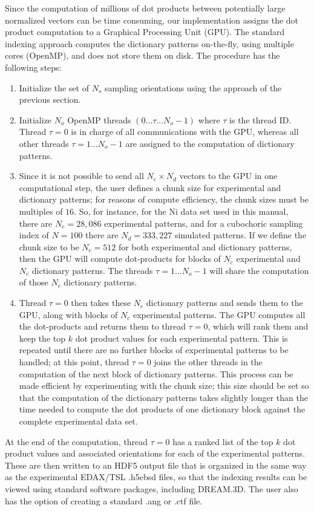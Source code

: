 \documentclass[DIV=calc, paper=letter, fontsize=11pt]{scrartcl}	 %
\begin{document}
Since the computation of millions of dot products between potentially large normalized vectors can be time consuming, our implementation 
assigns the dot product computation to a Graphical Processing Unit (GPU).  The standard indexing approach computes the dictionary patterns 
on-the-fly, using multiple cores (OpenMP), and does not store them on disk.  The procedure has the following steps:
\begin{enumerate}
\item Initialize the set of $N_s$ sampling orientations using the approach of the previous section.
\item Initialize $N_o$ OpenMP threads $(0\ldots \tau\ldots N_o-1)$ where $\tau$ is the thread ID.  Thread $\tau=0$ is in charge of all communications
with the GPU, whereas all other threads $\tau=1\ldots N_o-1$ are assigned to the computation of dictionary patterns.
\item Since it is not possible to send all $N_e\times N_d$ vectors to the GPU in one computational step, the user defines a chunk size for experimental and 
dictionary patterns; for reasons of compute efficiency, the chunk sizes must be multiples of $16$.  So, for instance, for the Ni data set used in this manual, there
are $N_e=28,086$ experimental patterns, and for a cubochoric sampling index of $N=100$ there are $N_d=333,227$ simulated patterns.  If we define the 
chunk size to be $N_c=512$ for both experimental and dictionary patterns, then the GPU will compute dot-products for blocks of $N_c$ experimental and 
$N_c$ dictionary patterns.  The threads $\tau=1\ldots N_o-1$ will share the computation of those $N_c$ dictionary patterns.  
\item Thread $\tau=0$ then takes
these $N_c$ dictionary patterns and sends them to the GPU, along with blocks of $N_c$ experimental patterns.  The GPU computes all the dot-products and 
returns them to thread $\tau=0$, which will rank them and keep the top $k$ dot product values for each experimental pattern.  This is repeated until there are no
further blocks of experimental patterns to be handled; at this point, thread $\tau=0$ joins the other threads in the computation of the next block of 
dictionary patterns.  This process can be made efficient by experimenting with the chunk size; this size should be set so that the computation of the dictionary patterns
takes slightly longer than the time needed to compute the dot products of one dictionary block against the complete experimental data set.
\end{enumerate}
At the end of the computation, thread $\tau=0$ has a ranked list of the top $k$ dot product values and associated orientations for each of the experimental patterns.
These are then written to an HDF5 output file that is organized in the same way as the experimental EDAX/TSL \textsf{.h5ebsd} files, so that the indexing results can
be viewed using standard software packages, including \textsf{DREAM.3D}. The user also has the option of creating a standard \textsf{.ang} or \textsf{.ctf} file.
\end{document}
